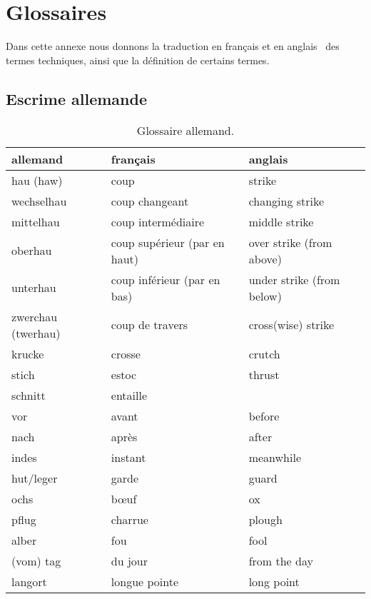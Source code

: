 \chapter{Glossaires}


Dans cette annexe nous donnons la traduction en français et en anglais~\footnotemark{} des termes techniques, ainsi que la définition de certains termes.





\section{Escrime allemande}


\begin{table}[h]
	\centering
	\begin{tabular}{lll}
		allemand &
			français &
			anglais
			\\
		\hline
		hau (haw) &
			coup &
			strike
			\\
		wechselhau &
			coup changeant &
			changing strike
			\\
		mittelhau &
			coup intermédiaire &
			middle strike
			\\
		oberhau &
			coup supérieur (par en haut) &
			over strike (from above)
			\\
		unterhau &
			coup inférieur (par en bas) &
			under strike (from below)
			\\
		zwerchau (twerhau) &
			coup de travers &
			cross(wise) strike
			\\
		krucke &
			crosse &
			crutch
			\\
		stich &
			estoc &
			thrust
			\\
		schnitt &
			entaille &
			\\
		vor &
			avant &
			before
			\\
		nach &
			après &
			after
			\\
		indes &
			instant &
			meanwhile
			\\
		hut/leger &
			garde &
			guard
			\\
		ochs &
			bœuf &
			ox
			\\
		pflug &
			charrue &
			plough
			\\
		alber &
			fou &
			fool
			\\
		(vom) tag &
			du jour &
			from the day \\
		langort &
			longue pointe &
			long point
	\end{tabular}
	\caption{Glossaire allemand.}
	\label{app:tab:glossaire-allemand}
\end{table}


